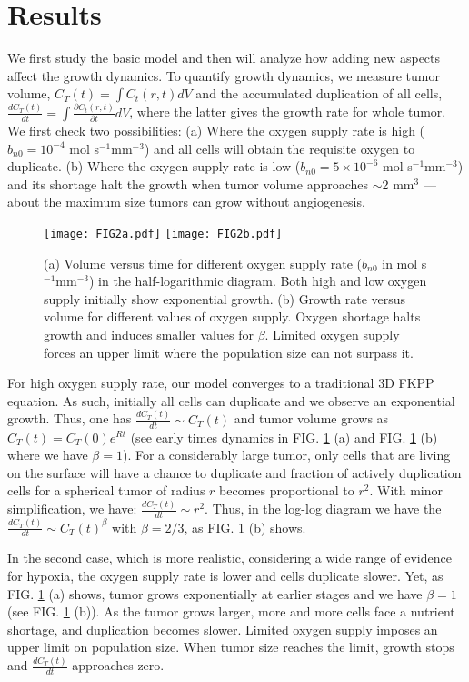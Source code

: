 \documentclass[aps,prl, superscriptaddress,groupedaddress]{revtex4}  %
\begin{document}
	\section{Results } 
	We first study the basic model and then will analyze how adding new aspects affect the growth dynamics. To quantify growth dynamics, we measure tumor volume, $C_T(t)=\int C_t(r,t)dV$ and the accumulated duplication of all cells, $\frac{dC_T(t)}{d t}=\int\frac{\partial C_t(r,t)}{\partial t} dV$, where the latter gives the growth rate for whole tumor. We first check two possibilities: (a) Where the oxygen supply rate is high  ($b_{n0}=10^{-4}$ mol s$^{-1}$mm$^{-3}$) and all cells will obtain the requisite oxygen to duplicate. (b) Where the oxygen supply rate is low ($b_{n0}=5 \times 10^{-6}$ mol s$^{-1}$mm$^{-3}$) and its shortage halt the growth when tumor volume approaches $\sim$2 mm$^3$ --- about the maximum size tumors can grow without angiogenesis.
	\begin{figure} [t]
		\centering
		\texttt{[image: FIG2a.pdf]} 
		\texttt{[image: FIG2b.pdf]} 
		\caption{(a) Volume versus time for different oxygen supply rate ($b_{n0}$ in mol s$^{-1}$mm$^{-3}$) in the half-logarithmic diagram. Both high and low oxygen supply initially show exponential growth. (b) Growth rate versus volume for different values of oxygen supply. Oxygen shortage halts growth and induces smaller values for $\beta$. Limited oxygen supply forces an upper limit where the population size can not surpass it.}
		\label{FIG2}
	\end{figure}
	
	For high oxygen supply rate, our model converges to a traditional 3D FKPP equation. As such, initially all cells can duplicate and we observe an exponential growth. Thus, one has $\frac{d C_T(t)}{d t} \sim C_T(t)$ and tumor volume grows as $C_T(t)=C_T(0) e^{Rt}$ (see early times dynamics in FIG. \ref{FIG2} (a) and FIG. \ref{FIG2} (b)  where  we have $\beta=1$).  For a considerably large tumor, only cells that are living on the surface will have a chance to duplicate and fraction of actively duplication cells for a spherical tumor of radius  $r$ becomes proportional to $ r^2$. With minor simplification,  we have: $\frac{d C_T(t)}{d t} \sim r^2$. Thus, in the log-log diagram we have the $\frac{d C_T(t)}{d t} \sim C_T(t)^{\beta}$ with $\beta=2/3$, as FIG. \ref{FIG2} (b) shows. 
	
	In the second case, which is more realistic, considering a wide range of evidence for hypoxia, the oxygen supply rate is lower and cells duplicate slower. Yet, as FIG. \ref{FIG2} (a) shows, tumor grows exponentially at earlier stages and we have $\beta=1$ (see FIG. \ref{FIG2} (b)). As the tumor grows larger, more and more cells face a nutrient shortage, and duplication becomes slower. Limited oxygen supply imposes an upper limit on population size. When tumor size reaches the limit, growth stops and $ \frac{d C_T(t)}{d t}$ approaches zero.  
	
\end{document}

